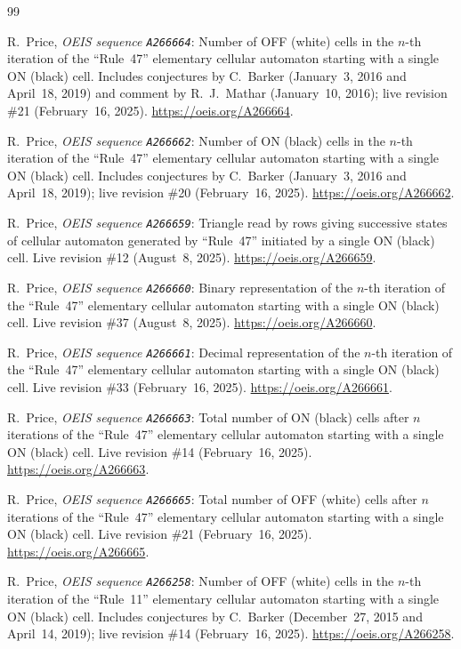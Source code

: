 \documentclass[11pt]{article}
\theoremstyle{definition}
\newcommand{\seq}[1]{\texttt{#1}}
\begin{document}
{\small
\begin{thebibliography}{99}\setlength{\itemsep}{2pt}
\raggedright

R.\ Price, \emph{OEIS sequence \seq{A266664}}: Number of OFF (white) cells in the $n$-th iteration of the ``Rule~47'' elementary cellular automaton starting with a single ON (black) cell. Includes conjectures by C.\ Barker (January~3, 2016 and April~18, 2019) and comment by R.~J.\ Mathar (January~10, 2016); live revision \#21 (February~16, 2025). \url{https://oeis.org/A266664}.

R.\ Price, \emph{OEIS sequence \seq{A266662}}: Number of ON (black) cells in the $n$-th iteration of the ``Rule~47'' elementary cellular automaton starting with a single ON (black) cell. Includes conjectures by C.\ Barker (January~3, 2016 and April~18, 2019); live revision \#20 (February~16, 2025). \url{https://oeis.org/A266662}.

R.\ Price, \emph{OEIS sequence \seq{A266659}}: Triangle read by rows giving successive states of cellular automaton generated by ``Rule~47'' initiated by a single ON (black) cell. Live revision \#12 (August~8, 2025). \url{https://oeis.org/A266659}.

R.\ Price, \emph{OEIS sequence \seq{A266660}}: Binary representation of the $n$-th iteration of the ``Rule~47'' elementary cellular automaton starting with a single ON (black) cell. Live revision \#37 (August~8, 2025). \url{https://oeis.org/A266660}.

R.\ Price, \emph{OEIS sequence \seq{A266661}}: Decimal representation of the $n$-th iteration of the ``Rule~47'' elementary cellular automaton starting with a single ON (black) cell. Live revision \#33 (February~16, 2025). \url{https://oeis.org/A266661}.

R.\ Price, \emph{OEIS sequence \seq{A266663}}: Total number of ON (black) cells after $n$ iterations of the ``Rule~47'' elementary cellular automaton starting with a single ON (black) cell. Live revision \#14 (February~16, 2025). \url{https://oeis.org/A266663}.

R.\ Price, \emph{OEIS sequence \seq{A266665}}: Total number of OFF (white) cells after $n$ iterations of the ``Rule~47'' elementary cellular automaton starting with a single ON (black) cell. Live revision \#21 (February~16, 2025). \url{https://oeis.org/A266665}.

R.\ Price, \emph{OEIS sequence \seq{A266258}}: Number of OFF (white) cells in the $n$-th iteration of the ``Rule~11'' elementary cellular automaton starting with a single ON (black) cell. Includes conjectures by C.\ Barker (December~27, 2015 and April~14, 2019); live revision \#14 (February~16, 2025). \url{https://oeis.org/A266258}.


\end{thebibliography}}
\end{document}
